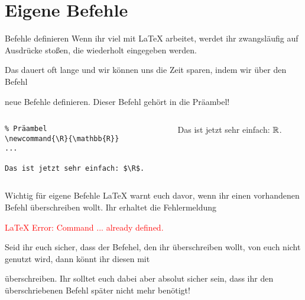 \section{Eigene Befehle}

\begin{frame}[fragile]{Befehle definieren}
Wenn ihr viel mit \LaTeX{} arbeitet, werdet ihr zwangsläufig auf Ausdrücke stoßen, die wiederholt eingegeben werden. 

\medskip\pause
Das dauert oft lange und wir können uns die Zeit sparen, indem wir über den Befehl 
\begin{center}
\end{center}
neue Befehle definieren. Dieser Befehl gehört in die Präambel! 
\begin{columns}
\begin{column}{0.55\textwidth}
\begin{codeblock}
\begin{small}
\begin{verbatim}
% Präambel 
\newcommand{\R}{\mathbb{R}}
...

Das ist jetzt sehr einfach: $\R$.

\end{verbatim}
\end{small}
\end{codeblock}
\end{column}
\begin{column}{0.35\textwidth}
Das ist jetzt sehr einfach: $\R$.
\end{column}
\end{columns}
\end{frame}

\begin{frame}[fragile]{Wichtig für eigene Befehle}
\LaTeX{} warnt euch davor, wenn ihr einen vorhandenen Befehl überschreiben wollt. Ihr erhaltet die Fehlermeldung
\begin{center}
\textcolor{red}{\LaTeX{} Error: Command ... already defined.}
\end{center}\pause
Seid ihr euch sicher, dass der Befehel, den ihr überschreiben wollt, von euch nicht genutzt wird, dann könnt ihr diesen mit 
\begin{center}
\end{center}
überschreiben. Ihr solltet euch dabei aber absolut sicher sein, dass ihr den überschriebenen Befehl später nicht mehr benötigt! 
\end{frame}